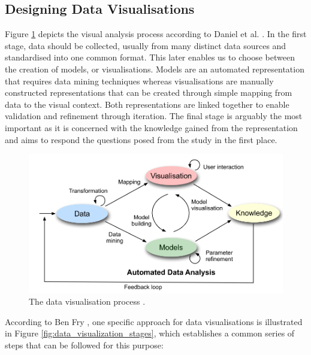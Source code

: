 \subsection{Designing Data Visualisations}
Figure \ref{fig:data_visualization_process} depicts the visual analysis process according to Daniel et al. \cite{KeimDaniel2010}. In the first stage,  data should be collected, usually from many distinct data sources and standardised into one common format. This later enables us to choose between the creation of models, or visualisations. Models are an automated representation that requires data mining techniques whereas visualisations are manually constructed  representations that can be created through simple mapping from data to the visual context. Both representations are linked together to enable validation and refinement through iteration. The final stage is arguably the most important as it is concerned with the knowledge gained from the representation and aims to respond the questions posed from the study in the first place.
\begin{figure}[!htb]
\begin{adjustbox}{width=1\textwidth,center=\textwidth}
  \centering

\includegraphics[scale=1]{images/data_visualization_process.png}
\end{adjustbox}
  \caption[The data visualisation process]{The data visualisation process \cite{KeimDaniel2010}. }
  \label{fig:data_visualization_process}
\end{figure}

According to Ben Fry \cite{Cleveland1993}, one specific approach for data visualisations is illustrated in Figure \ref{fig:data_visualization_stages}, which establishes a common series of steps that can be followed for this purpose:

